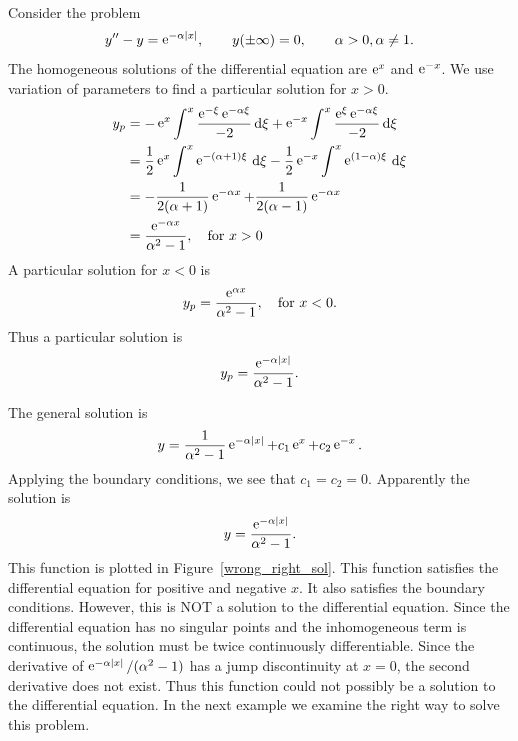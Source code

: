 \begin{Example}
  Consider the problem
  \[ 
  y'' - y = \mathop{\mathrm{e}}\nolimits^{-\alpha |x| }, \qquad y(\pm \infty) = 0, \qquad \alpha > 0, \alpha \neq 1.
  \]
  The homogeneous solutions of the differential equation are $\mathop{\mathrm{e}}\nolimits^x$ and $\mathop{\mathrm{e}}\nolimits^{-x}$.
  We use variation of parameters to find a particular solution for $x > 0$.
  \begin{align*}
    y_p &= - \mathop{\mathrm{e}}\nolimits^x \int^x \frac{\mathop{\mathrm{e}}\nolimits^{-\xi} \mathop{\mathrm{e}}\nolimits^{-\alpha \xi}}{-2} \,\mathrm{d} \xi
    + \mathop{\mathrm{e}}\nolimits^{-x} \int^x \frac{\mathop{\mathrm{e}}\nolimits^\xi \mathop{\mathrm{e}}\nolimits^{-\alpha \xi}}{-2}\,\mathrm{d} \xi 
    \\
    &= \frac{1}{2} \mathop{\mathrm{e}}\nolimits^x \int^x \mathop{\mathrm{e}}\nolimits^{-(\alpha+1)\xi}\,\mathrm{d} \xi
    - \frac{1}{2} \mathop{\mathrm{e}}\nolimits^{-x} \int^x \mathop{\mathrm{e}}\nolimits^{(1-\alpha)\xi} \,\mathrm{d} \xi 
    \\
    &= - \frac{1}{2(\alpha+1)} \mathop{\mathrm{e}}\nolimits^{-\alpha x}
    + \frac{1}{2(\alpha-1)} \mathop{\mathrm{e}}\nolimits^{-\alpha x} 
    \\
    &= \frac{\mathop{\mathrm{e}}\nolimits^{-\alpha x}}{\alpha^2 - 1}, \quad \mathrm{for}\ x > 0
  \end{align*}
  A particular solution for $x < 0$ is
  \[
  y_p = \frac{\mathop{\mathrm{e}}\nolimits^{\alpha x}}{\alpha^2 - 1}, \quad \mathrm{for}\ x < 0.
  \]
  Thus a particular solution is
  \[
  y_p = \frac{\mathop{\mathrm{e}}\nolimits^{-\alpha |x|}}{\alpha^2 - 1}.
  \]

  The general solution is
  \[ 
  y = \frac{1}{\alpha^2-1} \mathop{\mathrm{e}}\nolimits^{-\alpha |x|} + c_1 \mathop{\mathrm{e}}\nolimits^x + c_2 \mathop{\mathrm{e}}\nolimits^{-x}. 
  \]
  Applying the boundary conditions, we see that $c_1 = c_2 = 0$.  
  Apparently the solution is
  \[ 
  y = \frac{\mathop{\mathrm{e}}\nolimits^{-\alpha |x|}}{\alpha^2-1}.
  \]
  This function is plotted in Figure~\ref{wrong_right_sol}.  This
  function satisfies the differential equation for positive and negative
  $x$.  It also satisfies the boundary conditions.  However, this is NOT
  a solution to the differential equation.  Since the differential
  equation has no singular points and the inhomogeneous term is
  continuous, the solution must be twice continuously differentiable.
  Since the derivative of $\mathop{\mathrm{e}}\nolimits^{-\alpha |x|} / (\alpha^2-1)$ has a jump
  discontinuity at $x = 0$, the second derivative does not exist.  Thus
  this function could not possibly be a solution to the differential
  equation.  In the next example we examine the right way to solve this
  problem.
\end{Example}





